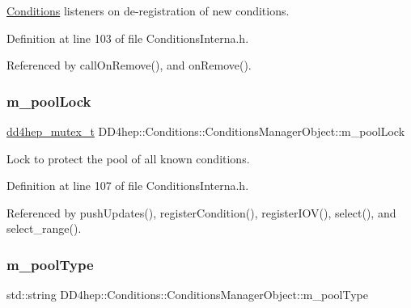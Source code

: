 \hyperlink{namespace_d_d4hep_1_1_conditions}{Conditions} listeners on de-\/registration of new conditions. 



Definition at line 103 of file Conditions\+Interna.\+h.



Referenced by call\+On\+Remove(), and on\+Remove().

\hypertarget{class_d_d4hep_1_1_conditions_1_1_conditions_manager_object_af0a0803e28ed3d30721609a420689e4a}{}\label{class_d_d4hep_1_1_conditions_1_1_conditions_manager_object_af0a0803e28ed3d30721609a420689e4a} 
\subsubsection{\texorpdfstring{m\+\_\+pool\+Lock}{m\_poolLock}}
{\footnotesize\ttfamily \hyperlink{struct_d_d4hep_1_1dd4hep__mutex__t}{dd4hep\+\_\+mutex\+\_\+t} D\+D4hep\+::\+Conditions\+::\+Conditions\+Manager\+Object\+::m\+\_\+pool\+Lock}



Lock to protect the pool of all known conditions. 



Definition at line 107 of file Conditions\+Interna.\+h.



Referenced by push\+Updates(), register\+Condition(), register\+I\+O\+V(), select(), and select\+\_\+range().

\hypertarget{class_d_d4hep_1_1_conditions_1_1_conditions_manager_object_acbd30bb422ca98796d1eabf4e17706a2}{}\label{class_d_d4hep_1_1_conditions_1_1_conditions_manager_object_acbd30bb422ca98796d1eabf4e17706a2} 
\subsubsection{\texorpdfstring{m\+\_\+pool\+Type}{m\_poolType}}
{\footnotesize\ttfamily std\+::string D\+D4hep\+::\+Conditions\+::\+Conditions\+Manager\+Object\+::m\+\_\+pool\+Type}



